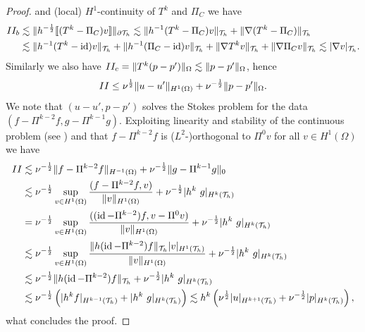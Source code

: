 \documentclass[pdflatex,sn-mathphys,Numbered]{sn-jnl}%
\theoremstyle{remark}%
\theoremstyle{definition}%
\begin{document}
\begin{proof}
  and (local) $H^1$-continuity of $T^k$ and $\Pi_C$ %
  we have
  \begin{align*}
  II_b & \lesssim \Vert h^{-\frac12} [\![ (T^k - \Pi_C) v]\!] \Vert_{\partial {\mathcal{T}_h}} \lesssim  \Vert  h^{-1}(T^k - \Pi_C) v \Vert_{{\mathcal{T}_h}} + \Vert \nabla (T^k - \Pi_C)  \Vert_{{\mathcal{T}_h}} \\
 &\lesssim  \Vert  h^{-1}(T^k - \operatorname{id}) v \Vert_{{\mathcal{T}_h}} + \Vert h^{-1} (\Pi_C - \operatorname{id}) v \Vert_{{\mathcal{T}_h}}
 + \Vert \nabla T^k v  \Vert_{{\mathcal{T}_h}} + \Vert \nabla \Pi_C v  \Vert_{{\mathcal{T}_h}} \lesssim  \vert  \nabla v \vert_{{\mathcal{T}_h}}.
 \end{align*}
Similarly we also have $II_c  =  \Vert  T^k (p-p') \Vert_{\Omega} \lesssim
 \Vert  p-p' \Vert_{\Omega}$, hence 
 $$II \leq \nu^{\frac12}  \Vert  u-u' \Vert_{H^1(\Omega)} + \nu^{-\frac12}
 \Vert  p-p' \Vert_{\Omega}.$$ We note that $(u-u', p-p')$ solves the Stokes
 problem for the data $(f- \Pi^{k-2}f,g-\Pi^{k-1}g)$. Exploiting
 linearity and stability of the continuous problem (see \cite[Theorem 8.2.1]{di2011mathematical}) and that $f-
 \Pi^{k-2}f$ is ($L^2$-)orthogonal to $\Pi^0 v$ for all $v \in
 H^1(\Omega)$ we have
\begin{align*}
  II & \lesssim \nu^{-\frac12} \Vert f - \Pi^{k-2} f \Vert_{H^{-1}(\Omega)} + \nu^{-\frac12} \Vert g - \Pi^{k-1} g \Vert_{0} \\
  & \lesssim \nu^{-\frac12} \sup_{v \in H^1(\Omega)} \frac{ (f - \Pi^{k-2} f,v)}{\Vert v \Vert_{H^{1}(\Omega)}} + \nu^{-\frac12} \vert h^k \ g \vert_{H^k({\mathcal{T}_h})} \\
  & = \nu^{-\frac12} \sup_{v \in H^1(\Omega)} \frac{ ((\operatorname{id} - \Pi^{k-2}) f,v - \Pi^0 v)}{\Vert v \Vert_{H^{1}(\Omega)}} + \nu^{-\frac12} \vert h^k \ g \vert_{H^k({\mathcal{T}_h})} \\
  & \lesssim \nu^{-\frac12} \sup_{v \in H^1(\Omega)} \frac{\Vert h(\operatorname{id} - \Pi^{k-2}) f \Vert_{{\mathcal{T}_h}} \vert  v \vert_{H^1({\mathcal{T}_h})}}{\Vert v \Vert_{H^{1}(\Omega)}} + \nu^{-\frac12} \vert h^k\ g \vert_{H^k({\mathcal{T}_h})} \\
  &   \lesssim \nu^{-\frac12} \Vert h (\operatorname{id} - \Pi^{k-2}) f \Vert_{{\mathcal{T}_h}} + \nu^{-\frac12} \vert h^k \ g \vert_{H^k({\mathcal{T}_h})}
  \\
  & \lesssim \nu^{-\frac12} \left( \vert h^k f \vert_{H^{k-1}({\mathcal{T}_h})} + \vert h^k \ g \vert_{H^k({\mathcal{T}_h})} \right)
    \lesssim h^k \left( \nu^{\frac12} \vert u \vert_{H^{k+1}({\mathcal{T}_h})} + \nu^{-\frac12}  \vert p \vert_{H^k({\mathcal{T}_h})} \right),
\end{align*}
what concludes the proof.


\end{proof}
\end{document}

